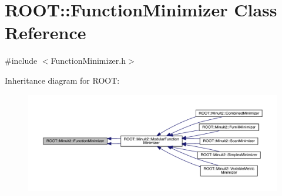 \hypertarget{classROOT_1_1Minuit2_1_1FunctionMinimizer}{}\section{R\+O\+OT\+:\+:Function\+Minimizer Class Reference}
\label{classROOT_1_1Minuit2_1_1FunctionMinimizer}


{\ttfamily \#include $<$Function\+Minimizer.\+h$>$}



Inheritance diagram for R\+O\+OT\+:\nopagebreak
\begin{figure}[H]
\begin{center}
\leavevmode
\includegraphics[width=350pt]{d0/d2b/classROOT_1_1Minuit2_1_1FunctionMinimizer__inherit__graph}
\end{center}
\end{figure}
